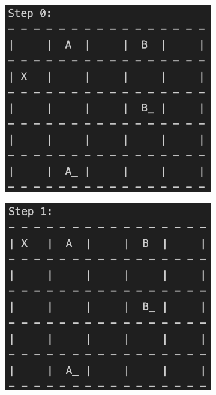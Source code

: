 \documentclass[11pt]{article}
\begin{document}
\begin{figure}[h]
    \centering
    \begin{subfigure}[b]{0.45\textwidth}
        \centering
        \includegraphics[width=\textwidth]{img/step_0.png}
    \end{subfigure}
    \hfill %
    \begin{subfigure}[b]{0.45\textwidth}
        \centering
        \includegraphics[width=\textwidth]{img/step_1.png}
    \end{subfigure}
    

\end{figure}
\end{document}
